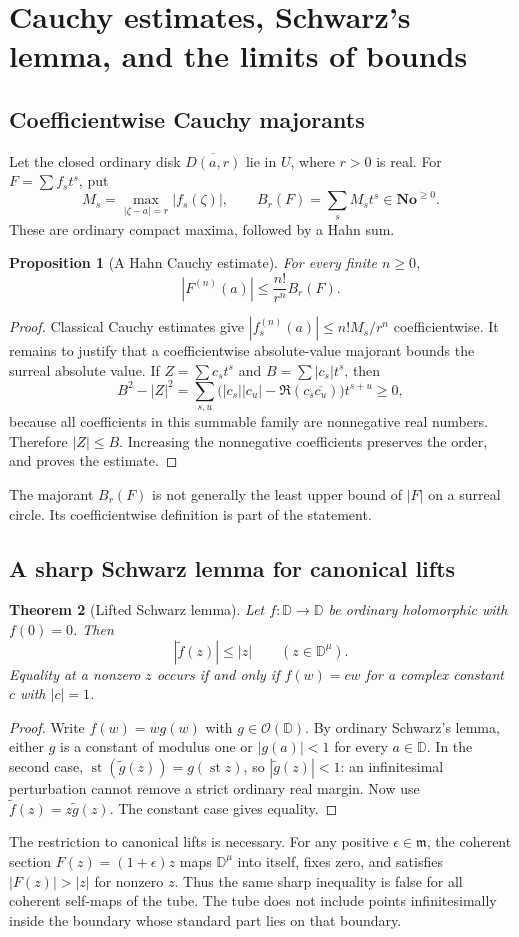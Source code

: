 \documentclass[11pt,oneside]{article}
\numberwithin{equation}{section}
\newtheorem{theorem}{Theorem}[section]
\newtheorem{proposition}[theorem]{Proposition}
\theoremstyle{definition}
\theoremstyle{remark}\newtheorem{remark}[theorem]{Remark}
\newcommand{\No}{\mathbf{No}}
\newcommand{\OO}{\mathcal O}
\newcommand{\m}{\mathfrak m}
\newcommand{\st}{\operatorname{st}}
\newcommand{\Disk}{\mathbb D}
\begin{document}
\section{Cauchy estimates, Schwarz's lemma, and the limits of bounds}
\subsection{Coefficientwise Cauchy majorants}
Let the closed ordinary disk $\overline{D(a,r)}$ lie in $U$, where $r>0$
is real. For $F=\sum f_s t^s$, put
\[
 M_s=\max_{|\zeta-a|=r}|f_s(\zeta)|,
 \qquad B_r(F)=\sum_s M_s t^s\in\No^{\geq0}.
\]
These are ordinary compact maxima, followed by a Hahn sum.

\begin{proposition}[A Hahn Cauchy estimate]\label{prop:estimate}
For every finite $n\geq0$,
\[
 |F^{(n)}(a)|\leq \frac{n!}{r^n}B_r(F).
\]
\end{proposition}
\begin{proof}
Classical Cauchy estimates give
$|f_s^{(n)}(a)|\leq n!M_s/r^n$ coefficientwise. It remains to justify
that a coefficientwise absolute-value majorant bounds the surreal
absolute value. If $Z=\sum c_s t^s$ and $B=\sum |c_s|t^s$, then
\[
 B^2-|Z|^2
 =\sum_{s,u}\bigl(|c_s||c_u|-\Re(c_s\overline{c_u})\bigr)t^{s+u}
 \geq0,
\]
because all coefficients in this summable family are nonnegative real
numbers. Therefore $|Z|\leq B$. Increasing the nonnegative coefficients
preserves the order, and proves the estimate.
\end{proof}
The majorant $B_r(F)$ is not generally the least upper bound of $|F|$ on
a surreal circle. Its coefficientwise definition is part of the statement.

\subsection{A sharp Schwarz lemma for canonical lifts}
\begin{theorem}[Lifted Schwarz lemma]\label{thm:schwarz}
Let $f:\Disk\to\Disk$ be ordinary holomorphic with $f(0)=0$. Then
\[
 |\widetilde f(z)|\leq|z|\qquad(z\in\Disk^\mu).
\]
Equality at a nonzero $z$ occurs if and only if $f(w)=cw$ for a complex
constant $c$ with $|c|=1$.
\end{theorem}
\begin{proof}
Write $f(w)=wg(w)$ with $g\in\OO(\Disk)$. By ordinary Schwarz's lemma,
either $g$ is a constant of modulus one or $|g(a)|<1$ for every
$a\in\Disk$. In the second case,
$\st(\widetilde g(z))=g(\st z)$, so
$|\widetilde g(z)|<1$: an infinitesimal perturbation cannot remove a
strict ordinary real margin. Now use
$\widetilde f(z)=z\widetilde g(z)$. The constant case gives equality.
\end{proof}
The restriction to canonical lifts is necessary. For any positive
$\epsilon\in\m$, the coherent section $F(z)=(1+\epsilon)z$ maps
$\Disk^\mu$ into itself, fixes zero, and satisfies $|F(z)|>|z|$ for
nonzero $z$. Thus the same sharp inequality is false for all coherent
self-maps of the tube. The tube does not include points infinitesimally
inside the boundary whose standard part lies on that boundary.
\end{document}
